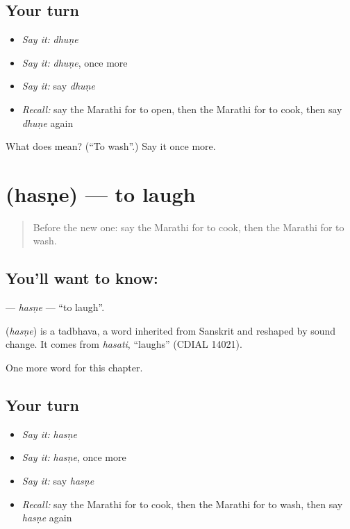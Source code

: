 \subsection*{Your turn}
\begin{itemize}
\raggedright
  \item \emph{Say it:} \emph{dhuṇe}
  \item \emph{Say it:} \emph{dhuṇe}, once more
  \item \emph{Say it:} say \emph{dhuṇe}
  \item \emph{Recall:} say the Marathi for to open, then the Marathi for to cook, then say \emph{dhuṇe} again
\end{itemize}

\begin{tcolorbox}[breakable,colback=teal!4,colframe=teal!35!black,title={Before you move on}]
What does  mean? (\textquotedblleft{}To wash\textquotedblright{}.) Say it once more.
\end{tcolorbox}
\section[\texorpdfstring{\mr{हसणे} (hasṇe)}{हसणे (hasṇe)}]{ (hasṇe) — to laugh}

\label{lesson:MR-C79-hasne}



\begin{quote}
Before the new one: say the Marathi for to cook, then the Marathi for to wash.
\end{quote}

\subsection*{You'll want to know: }
\textbf{} — \emph{hasṇe} — \textquotedblleft{}to laugh\textquotedblright{}.

\begin{cousinweb}
\textbf{} (\emph{hasṇe}) is a tadbhava, a word inherited from Sanskrit and reshaped by sound change. It comes from \emph{hasati}, \textquotedblleft{}laughs\textquotedblright{} (CDIAL 14021).
\end{cousinweb}

\begin{grammarlens}[title={What you've built}]
One more word for this chapter.
\end{grammarlens}

\subsection*{Your turn}
\begin{itemize}
\raggedright
  \item \emph{Say it:} \emph{hasṇe}
  \item \emph{Say it:} \emph{hasṇe}, once more
  \item \emph{Say it:} say \emph{hasṇe}
  \item \emph{Recall:} say the Marathi for to cook, then the Marathi for to wash, then say \emph{hasṇe} again
\end{itemize}

